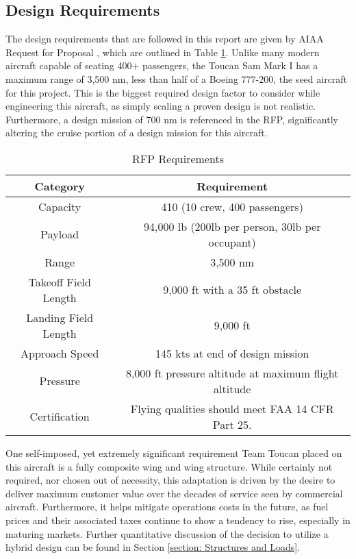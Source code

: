 \subsection{Design Requirements}
The design requirements that are followed in this report are given by AIAA Request for Proposal \cite{RFP}, which are outlined in Table \ref{uno}.  Unlike many modern aircraft capable of seating 400+ passengers, the Toucan Sam Mark I has a maximum range of 3,500 nm, less than half of a Boeing 777-200, the seed aircraft for this project.  This is the biggest required design factor to consider while engineering this aircraft, as simply scaling a proven design is not realistic.  Furthermore, a design mission of 700 nm is referenced in the RFP, significantly altering the cruise portion of a design mission for this aircraft.  

\begin{table}[h!] 
    \centering
    \caption{RFP Requirements}
    \begin{tabular}{ |c||c| }\toprule
    \textbf{Category} & \textbf{Requirement} \\\hline\hline
    Capacity & 410 (10 crew, 400 passengers) \\\hline
    Payload & 94,000 lb (200lb per person, 30lb per occupant) \\\hline
    Range & 3,500 nm \\\hline
    Takeoff Field Length & 9,000 ft with a 35 ft obstacle \\\hline
    Landing Field Length & 9,000 ft \\\hline
    Approach Speed & 145 kts at end of design mission\\\hline
    Pressure & 8,000 ft pressure altitude at maximum flight altitude \\\hline
    Certification & Flying qualities should meet FAA 14 CFR Part 25.\\\hline 

    \end{tabular}\label{uno}
\end{table}

One self-imposed, yet extremely significant requirement Team Toucan placed on this aircraft is a fully composite wing and wing structure. While certainly not required, nor chosen out of necessity, this adaptation is driven by the desire to deliver maximum customer value over the decades of service seen by commercial aircraft.  Furthermore, it helps mitigate operations costs in the future, as fuel prices and their associated taxes continue to show a tendency to rise, especially in maturing markets.  Further quantitative discussion of the decision to utilize a hybrid design can be found in Section \ref{section: Structures and Loads}.

